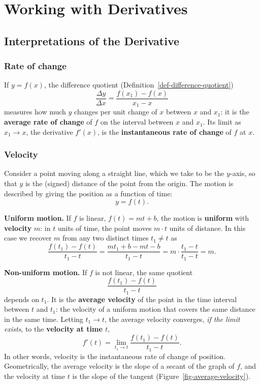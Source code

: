 \documentclass[
  letterpaper,
  DIV=11,
  numbers=noendperiod]{scrreprt}
\theoremstyle{plain}
\theoremstyle{plain}
\theoremstyle{definition}
\theoremstyle{definition}
\theoremstyle{definition}
\theoremstyle{plain}
\theoremstyle{plain}
\theoremstyle{remark}
\begin{document}
\chapter{Working with Derivatives}\label{working-with-derivatives}

\section{Interpretations of the
Derivative}\label{interpretations-of-the-derivative}

\subsection{Rate of change}\label{rate-of-change}

If \(y=f(x)\), the difference quotient
(Definition~\ref{def-difference-quotient}) \[
\frac{\Delta y}{\Delta x} = \frac{f(x_1)-f(x)}{x_1-x}
\] measures how much \(y\) changes per unit change of \(x\) between
\(x\) and \(x_1\): it is the \textbf{average rate of change} of \(f\) on
the interval between \(x\) and \(x_1\). Its limit as \(x_1\to x\), the
derivative \(f'(x)\), is the \textbf{instantaneous rate of change} of
\(f\) at \(x\).

\subsection{Velocity}\label{velocity}

Consider a point moving along a straight line, which we take to be the
\(y\)-axis, so that \(y\) is the (signed) distance of the point from the
origin. The motion is described by giving the position as a function of
time: \[
y = f(t).
\]

\textbf{Uniform motion.} If \(f\) is linear, \(f(t)=mt+b\), the motion
is \textbf{uniform} with \textbf{velocity} \(m\): in \(t\) units of
time, the point moves \(m\cdot t\) units of distance. In this case we
recover \(m\) from any two distinct times \(t_1\neq t\) as \[
\frac{f(t_1)-f(t)}{t_1-t} = \frac{mt_1+b-mt-b}{t_1-t} = m\cdot\frac{t_1-t}{t_1-t} = m.
\]

\textbf{Non-uniform motion.} If \(f\) is not linear, the same quotient
\[
\frac{f(t_1)-f(t)}{t_1-t}
\] depends on \(t_1\). It is the \textbf{average velocity} of the point
in the time interval between \(t\) and \(t_1\): the velocity of a
uniform motion that covers the same distance in the same time. Letting
\(t_1\to t\), the average velocity converges, \emph{if the limit
exists}, to the \textbf{velocity at time \(t\)}, \[
f'(t) = \lim_{t_1\to t}\frac{f(t_1)-f(t)}{t_1-t}.
\] In other words, velocity is the instantaneous rate of change of
position. Geometrically, the average velocity is the slope of a secant
of the graph of \(f\), and the velocity at time \(t\) is the slope of
the tangent (Figure~\ref{fig-average-velocity}).
\end{document}
